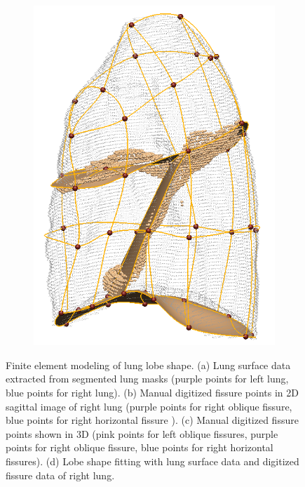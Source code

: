 {\begin{figure}[htbp]
\begin{subfigure}{.32\linewidth}
  \includegraphics[width=\linewidth,trim={{.0\wd0} {.0\wd0} {.0\wd0} {.0\wd0}},clip]{Segmentation/Image/LobeFitting2.png}
  \caption{}
  \label{fig:LobeShapeGenereation-d} 
\end{subfigure}
\caption{Finite element modeling of lung lobe shape. (a) Lung surface data extracted from segmented lung masks (purple points for left lung, blue points for right lung). (b) Manual digitized fissure points in 2D sagittal image of right lung (purple points for right oblique fissure, blue points for right horizontal fissure ). (c) Manual digitized fissure points shown in 3D (pink points for left oblique fissures, purple points for right oblique fissure, blue points for right horizontal fissures). (d) Lobe shape fitting with lung surface data and digitized fissure data of right lung.}
\label{fig:LobeShapeGenereation}
\end{figure}

}
